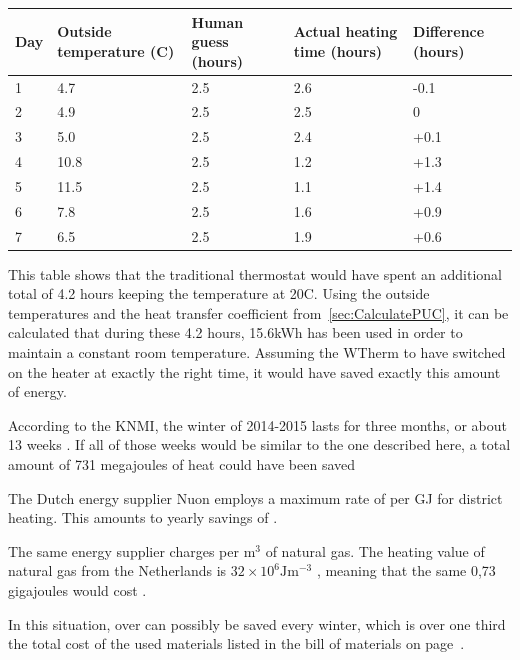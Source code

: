 \documentclass[12pt,a4paper,final]{report}
\begin{document}
\begingroup
	\setlength{\LTleft}{-20cm plus -1fill}
	\setlength{\LTright}{\LTleft}
    \begin{longtable}{ | p{1.0cm} | p{3cm} | p{3cm} | p{3cm} | p{2cm} |}
    \hline
    Day & Outside temperature (\degree{}C) & Human guess (hours) & Actual heating time (hours) & Difference (hours) \\ 
    \hline
    1 & 4.7 & 2.5 & 2.6 & -0.1\\ 
    \hline
    2 & 4.9 & 2.5 & 2.5 & 0\\
    \hline
    3 & 5.0 & 2.5 & 2.4 & +0.1\\
    \hline
    4 & 10.8 & 2.5 & 1.2 & +1.3\\
    \hline
    5 & 11.5 & 2.5 & 1.1 & +1.4\\
    \hline
    6 & 7.8 & 2.5 & 1.6 & +0.9\\
    \hline
    7 & 6.5 & 2.5 & 1.9 & +0.6\\
    \hline 
    \end{longtable}
\endgroup


This table shows that the traditional thermostat would have spent an additional total of 4.2 hours keeping the temperature at 20\degree{}C. Using the outside temperatures and the heat transfer coefficient from~\ref{sec:CalculatePUC}, it can be calculated that during these 4.2 hours, 15.6kWh has been used in order to maintain a constant room temperature. Assuming the WTherm to have switched on the heater at exactly the right time, it would have saved exactly this amount of energy. 

According to the KNMI, the winter of 2014-2015 lasts for three months, or about 
13 weeks \cite{KNMIseizoensdata}. If all of those weeks would be similar to the one described here, a total amount of 731 megajoules of heat could have been saved

The Dutch energy supplier Nuon employs a maximum rate of  per GJ for district heating\cite{NuonStadsverwarming}. This amounts to yearly savings of .

The same energy supplier charges  per $\mathrm{m^{3}}$ of natural gas\cite{NuonGas}. The heating value of natural gas from the Netherlands is $\mathrm{32\times 10^{6} Jm^{-3}}$ \cite{BinasHeatingValue}, meaning that the same 0,73 gigajoules would cost .

In this situation, over  can possibly be saved every winter, which is over one third the total cost of the used materials listed in the bill of materials on page~\pageref{chap:BOM}.
\end{document}
